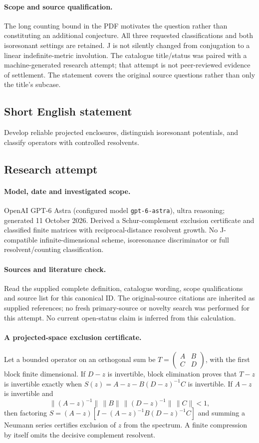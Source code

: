 \documentclass[11pt]{article}
\newcommand{\C}{\mathbb C}
\begin{document}
\paragraph{Scope and source qualification.}The long counting bound in the PDF motivates the question rather than constituting an additional conjecture. All three requested classifications and both isoresonant settings are retained. J is not silently changed from conjugation to a linear indefinite-metric involution. The catalogue title/status was paired with a machine-generated research attempt; that attempt is not peer-reviewed evidence of settlement. The statement covers the original source questions rather than only the title’s subcase.
\subsection{Short English statement}
Develop reliable projected enclosures, distinguish isoresonant potentials, and classify operators with controlled resolvents.
\subsection{Research attempt}
\paragraph{Model, date and investigated scope.}
OpenAI GPT-6 Astra (configured model \texttt{gpt-6-astra}), ultra reasoning; generated 11 October 2026. Derived a Schur-complement exclusion certificate and classified finite matrices with reciprocal-distance resolvent growth. No J-compatible infinite-dimensional scheme, isoresonance discriminator or full resolvent/counting classification.

\paragraph{Sources and literature check.}
Read the supplied complete definition, catalogue wording, scope qualifications and source list for this canonical ID. The original-source citations are inherited as supplied references; no fresh primary-source or novelty search was performed for this attempt. No current open-status claim is inferred from this calculation.

\paragraph{A projected-space exclusion certificate.}Let a bounded operator on an orthogonal sum be \(T=\begin{pmatrix}A&B\\C&D\end{pmatrix}\), with the first block finite dimensional. If \(D-z\) is invertible, block elimination proves that \(T-z\) is invertible exactly when \(S(z)=A-z-B(D-z)^{-1}C\) is invertible. If \(A-z\) is invertible and
\[\|(A-z)^{-1}\|\,\|B\|\,\|(D-z)^{-1}\|\,\|C\|<1,
\]
then factoring \(S=(A-z)[I-(A-z)^{-1}B(D-z)^{-1}C]\) and summing a Neumann series certifies exclusion of \(z\) from the spectrum. A finite compression by itself omits the decisive complement resolvent.
\end{document}
